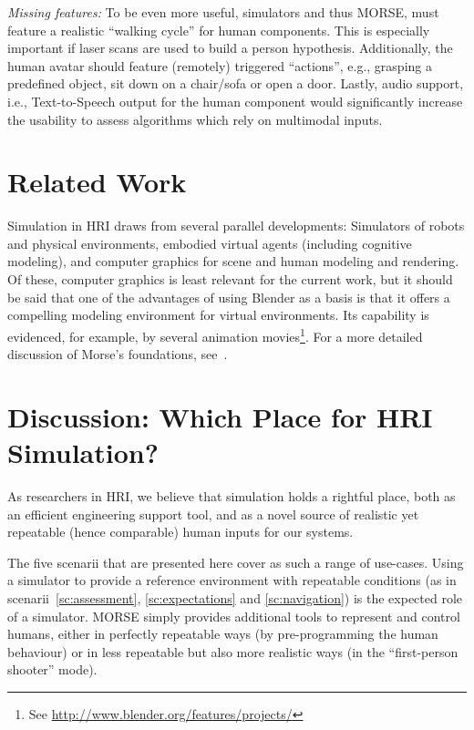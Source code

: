 \documentclass[conference]{IEEEtran}
\begin{document}
\emph{Missing features:} To be even more useful, simulators and thus MORSE, must
feature a realistic ``walking cycle'' for human components. This is especially
important if laser scans are used to build a person hypothesis. Additionally, the
human avatar should feature (remotely) triggered ``actions'', e.g., grasping a 
predefined object, sit down on a chair/sofa or open a door. Lastly, audio support, 
i.e., Text-to-Speech output for the human component would significantly increase
the usability to assess algorithms which rely on multimodal inputs.  

\section{Related Work}

Simulation in HRI draws from several parallel developments: Simulators
of robots and physical environments, embodied virtual agents (including
cognitive modeling), and computer graphics for scene and human modeling and
rendering. Of these, computer graphics is least relevant for the current work,
but it should be said that one of the advantages of using Blender as a basis
is that it offers a compelling modeling environment for virtual environments. 
Its capability is evidenced, for example, by several animation movies\footnote{See 
\url{http://www.blender.org/features/projects/}}. For a more detailed 
discussion of Morse's foundations, see~\cite{Echeverria2011}.



\section{Discussion: Which Place for HRI Simulation?}

As researchers in HRI, we believe that simulation holds a rightful place, both as
an efficient engineering support tool, and as a novel source of realistic yet
repeatable (hence comparable) human inputs for our systems.

The five scenarii that are presented here cover as such a range of use-cases.
Using a simulator to provide a reference environment with repeatable conditions
(as in scenarii~\ref{sc:assessment}, \ref{sc:expectations} and
\ref{sc:navigation}) is the expected role of a simulator. MORSE simply provides
additional tools to represent and control humans, either in perfectly repeatable
ways (by pre-programming the human behaviour) or in less repeatable but also
more realistic ways (in the ``first-person shooter'' mode).
\end{document}
